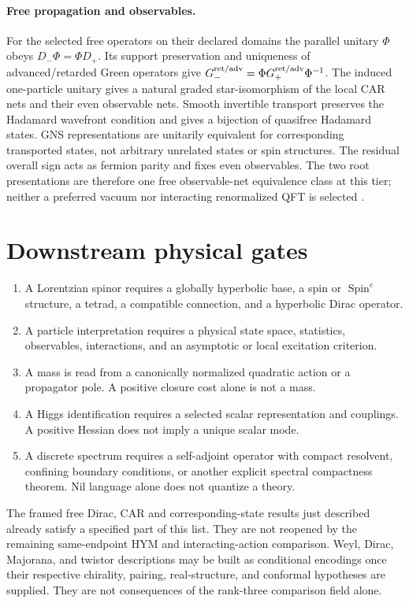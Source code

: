 \documentclass[11pt]{article}
\begin{document}
\paragraph{Free propagation and observables.}\label{sec:fsb04n}
For the selected free operators on their declared domains the parallel unitary
$\Phi$ obeys $D_-\Phi=\Phi D_+$. Its support preservation and uniqueness
of advanced/retarded Green operators give
$G_-^{\rm ret/adv}=\Phi G_+^{\rm ret/adv}\Phi^{-1}$. The induced
one-particle unitary gives a natural graded star-isomorphism of the local CAR
nets and their even observable nets. Smooth invertible transport preserves
the Hadamard wavefront condition and gives a bijection of quasifree Hadamard
states. GNS representations are unitarily equivalent for corresponding
transported states, not arbitrary unrelated states or spin structures.
The residual overall sign acts as fermion parity and fixes even observables.
The two root presentations are therefore one free observable-net equivalence
class at this tier; neither a preferred vacuum nor interacting renormalized
QFT is selected \cite{FSB04n}.

\section{Downstream physical gates}

\begin{enumerate}
\item A Lorentzian spinor requires a globally hyperbolic base, a spin or
$\operatorname{Spin}^c$ structure, a tetrad, a compatible connection, and a
hyperbolic Dirac operator.
\item A particle interpretation requires a physical state space, statistics,
observables, interactions, and an asymptotic or local excitation criterion.
\item A mass is read from a canonically normalized quadratic action or a
propagator pole.  A positive closure cost alone is not a mass.
\item A Higgs identification requires a selected scalar representation and
couplings.  A positive Hessian does not imply a unique scalar mode.
\item A discrete spectrum requires a self-adjoint operator with compact
resolvent, confining boundary conditions, or another explicit spectral
compactness theorem.  Nil language alone does not quantize a theory.
\end{enumerate}

The framed free Dirac, CAR and corresponding-state results just described
already satisfy a specified part of this list. They are not reopened by the
remaining same-endpoint HYM and interacting-action comparison.
Weyl, Dirac, Majorana, and twistor descriptions may be built as conditional
encodings once their respective chirality, pairing, real-structure, and
conformal hypotheses are supplied.  They are not consequences of the
rank-three comparison field alone.
\end{document}
